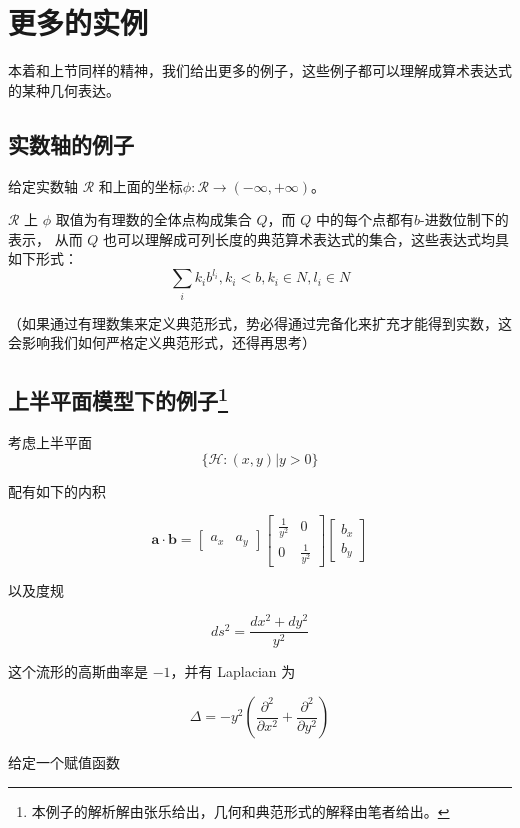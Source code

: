 \documentclass[a4paper,12pt]{article}
\numberwithin{definition}{section}
\numberwithin{lemma}{section}
\numberwithin{proposition}{section}
\numberwithin{theorem}{section}
\numberwithin{grammar}{section}
\numberwithin{program}{section}
\numberwithin{convention}{section}
\numberwithin{corollary}{section}
\begin{document}
\newpage

\section{更多的实例}

本着和上节同样的精神，我们给出更多的例子，这些例子都可以理解成算术表达式的某种几何表达。

\subsection{实数轴的例子}

给定实数轴 $\mathcal{R}$ 和上面的坐标$\phi: \mathcal{R} \to (-\infty, +\infty)$。

$\mathcal{R}$ 上 $\phi$ 取值为有理数的全体点构成集合 $Q$，而 $Q$ 中的每个点都有$b$-进数位制下的表示，
从而 $Q$ 也可以理解成可列长度的典范算术表达式的集合，这些表达式均具如下形式：
$$
\sum_{i} k_i b^{l_i}, k_i < b, k_i \in N, l_i \in N
$$

（如果通过有理数集来定义典范形式，势必得通过完备化来扩充才能得到实数，这会影响我们如何严格定义典范形式，还得再思考）

\subsection{上半平面模型下的例子\footnote{本例子的解析解由张乐给出，几何和典范形式的解释由笔者给出。}}
\label{subsec:uhp}

考虑上半平面
\[
\{\mathcal{H}: (x, y) | y > 0 \}
\]

配有如下的内积

\[
\mathbf{a} \cdot \mathbf{b} = \begin{bmatrix} a_x & a_y \end{bmatrix} \begin{bmatrix} \frac{1}{y^2} & 0 \\ 0 & \frac{1}{y^2} \end{bmatrix} \begin{bmatrix} b_x \\ b_y \end{bmatrix}
\]

以及度规

\[
ds^2 = \frac{dx^2 + dy^2}{y^2}
\]

这个流形的高斯曲率是 $-1$，并有 Laplacian 为

\[
\Delta = - y^2 (\frac{\partial^2}{\partial x^2} + \frac{\partial^2}{\partial y^2})
\]

给定一个赋值函数
\end{document}
